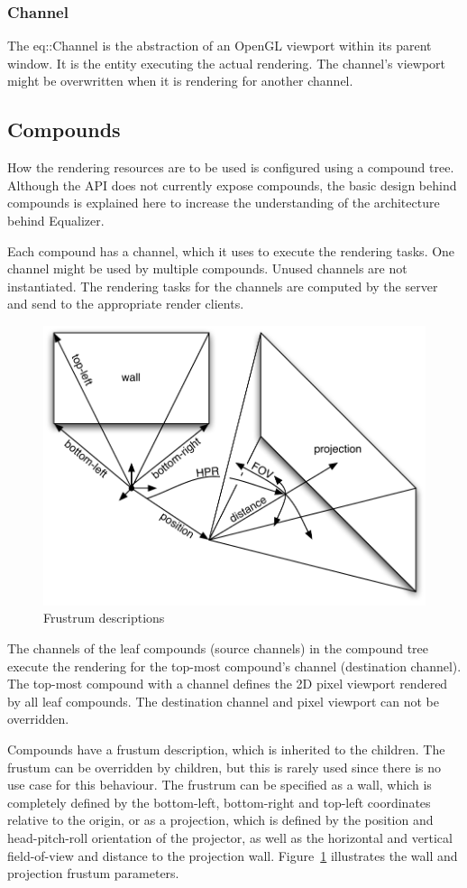 \documentclass[10pt,a4]{scrartcl}
\newcommand{\fig}[1]{Figure~\ref{#1}}
\begin{document}
\subsubsection{Channel}

The \textsf{eq::Channel} is the abstraction of an OpenGL viewport within
its parent window. It is the entity executing the actual rendering. The
channel's viewport might be overwritten when it is rendering for another
channel.


\subsection{Compounds}

How the rendering resources are to be used is configured using a
compound tree. Although the API does not currently expose compounds, the
basic design behind compounds is explained here to increase the
understanding of the architecture behind Equalizer.

Each compound has a channel, which it uses to execute the rendering
tasks. One channel might be used by multiple compounds. Unused channels
are not instantiated. The rendering tasks for the channels are computed
by the server and send to the appropriate render clients.

\begin{figure}
  \includegraphics[width=.6\textwidth]{images/frustra.pdf}
  {\caption{\small\label{fFrustra}Frustrum descriptions}}
\end{figure}
The channels of the leaf compounds (source channels) in the compound
tree execute the rendering for the top-most compound's channel
(destination channel). The top-most compound with a channel defines the
2D pixel viewport rendered by all leaf compounds. The destination
channel and pixel viewport can not be overridden.

Compounds have a frustum description, which is inherited to the
children. The frustum can be overridden by children, but this is rarely
used since there is no use case for this behaviour. The frustrum can be
specified as a wall, which is completely defined by the bottom-left,
bottom-right and top-left coordinates relative to the origin, or as a
projection, which is defined by the position and head-pitch-roll
orientation of the projector, as well as the horizontal and vertical
field-of-view and distance to the projection wall. \fig{fFrustra}
illustrates the wall and projection frustum parameters.
\end{document}
